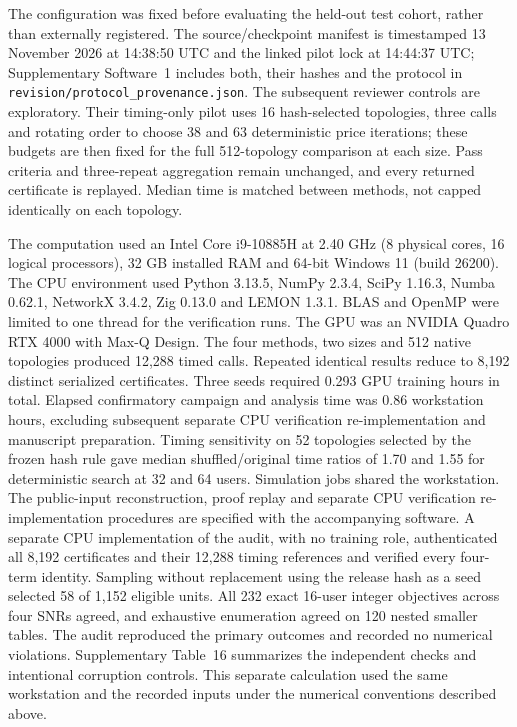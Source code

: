 \documentclass[lineno,pdflatex,sn-nature]{sn-jnl}
\begin{document}
The configuration was fixed before evaluating the held-out test cohort, rather than externally registered. The source/checkpoint manifest is timestamped 13 November 2026 at 14:38:50 UTC and the linked pilot lock at 14:44:37 UTC; Supplementary Software~1 includes both, their hashes and the protocol in \texttt{revision/protocol\_provenance.json}. The subsequent reviewer controls are exploratory. Their timing-only pilot uses 16 hash-selected topologies, three calls and rotating order to choose 38 and 63 deterministic price iterations; these budgets are then fixed for the full 512-topology comparison at each size. Pass criteria and three-repeat aggregation remain unchanged, and every returned certificate is replayed. Median time is matched between methods, not capped identically on each topology.


The computation used an Intel Core i9-10885H at 2.40 GHz (8 physical cores, 16 logical processors), 32 GB installed RAM and 64-bit Windows 11 (build 26200). The CPU environment used Python 3.13.5, NumPy 2.3.4, SciPy 1.16.3, Numba 0.62.1, NetworkX 3.4.2, Zig 0.13.0 and LEMON 1.3.1. BLAS and OpenMP were limited to one thread for the verification runs. The GPU was an NVIDIA Quadro RTX 4000 with Max-Q Design. The four methods, two sizes and 512 native topologies produced 12,288 timed calls. Repeated identical results reduce to 8,192 distinct serialized certificates. Three seeds required 0.293 GPU training hours in total. Elapsed confirmatory campaign and analysis time was 0.86 workstation hours, excluding subsequent separate CPU verification re-implementation and manuscript preparation. Timing sensitivity on 52 topologies selected by the frozen hash rule gave median shuffled/original time ratios of 1.70 and 1.55 for deterministic search at 32 and 64 users. Simulation jobs shared the workstation. The public-input reconstruction, proof replay and separate CPU verification re-implementation procedures are specified with the accompanying software. A separate CPU implementation of the audit, with no training role, authenticated all 8,192 certificates and their 12,288 timing references and verified every four-term identity. Sampling without replacement using the release hash as a seed selected 58 of 1,152 eligible units. All 232 exact 16-user integer objectives across four SNRs agreed, and exhaustive enumeration agreed on 120 nested smaller tables. The audit reproduced the primary outcomes and recorded no numerical violations. Supplementary Table~16 summarizes the independent checks and intentional corruption controls. This separate calculation used the same workstation and the recorded inputs under the numerical conventions described above.
\end{document}
